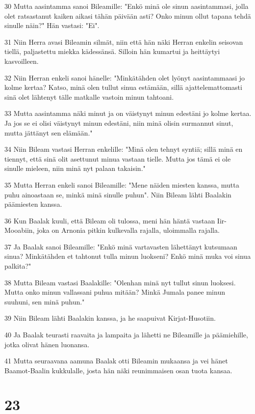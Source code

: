 \par 30 Mutta aasintamma sanoi Bileamille: "Enkö minä ole sinun aasintammasi, jolla olet ratsastanut kaiken aikasi tähän päivään asti? Onko minun ollut tapana tehdä sinulle näin?" Hän vastasi: "Ei".
\par 31 Niin Herra avasi Bileamin silmät, niin että hän näki Herran enkelin seisovan tiellä, paljastettu miekka kädessänsä. Silloin hän kumartui ja heittäytyi kasvoilleen.
\par 32 Niin Herran enkeli sanoi hänelle: "Minkätähden olet lyönyt aasintammaasi jo kolme kertaa? Katso, minä olen tullut sinua estämään, sillä ajattelemattomasti sinä olet lähtenyt tälle matkalle vastoin minun tahtoani.
\par 33 Mutta aasintamma näki minut ja on väistynyt minun edestäni jo kolme kertaa. Ja jos se ei olisi väistynyt minun edestäni, niin minä olisin surmannut sinut, mutta jättänyt sen elämään."
\par 34 Niin Bileam vastasi Herran enkelille: "Minä olen tehnyt syntiä; sillä minä en tiennyt, että sinä olit asettunut minua vastaan tielle. Mutta jos tämä ei ole sinulle mieleen, niin minä nyt palaan takaisin."
\par 35 Mutta Herran enkeli sanoi Bileamille: "Mene näiden miesten kanssa, mutta puhu ainoastaan se, minkä minä sinulle puhun". Niin Bileam lähti Baalakin päämiesten kanssa.
\par 36 Kun Baalak kuuli, että Bileam oli tulossa, meni hän häntä vastaan Iir-Mooabiin, joka on Arnonia pitkin kulkevalla rajalla, uloimmalla rajalla.
\par 37 Ja Baalak sanoi Bileamille: "Enkö minä vartavasten lähettänyt kutsumaan sinua? Minkätähden et tahtonut tulla minun luokseni? Enkö minä muka voi sinua palkita?"
\par 38 Mutta Bileam vastasi Baalakille: "Olenhan minä nyt tullut sinun luoksesi. Mutta onko minun vallassani puhua mitään? Minkä Jumala panee minun suuhuni, sen minä puhun."
\par 39 Niin Bileam lähti Baalakin kanssa, ja he saapuivat Kirjat-Husotiin.
\par 40 Ja Baalak teurasti raavaita ja lampaita ja lähetti ne Bileamille ja päämiehille, jotka olivat hänen luonansa.
\par 41 Mutta seuraavana aamuna Baalak otti Bileamin mukaansa ja vei hänet Baamot-Baalin kukkulalle, josta hän näki reunimmaisen osan tuota kansaa.

\chapter{23}

